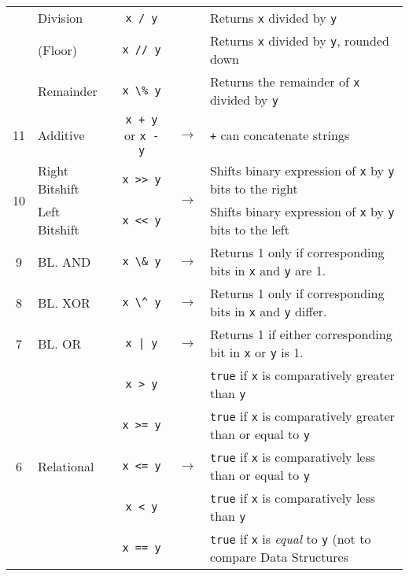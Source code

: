 \documentclass{article}
\begin{document}
\begin{center}
\begin{tabularx}{\textwidth}{clccX}
                      & Division & \lstinline|x / y| & & Returns \lstinline|x| divided by \lstinline|y|\\
                      & (Floor) & \lstinline|x // y| & & Returns \lstinline|x| divided by \lstinline|y|, rounded down\\
                      & Remainder & \lstinline|x \% y| & & Returns the remainder of \lstinline|x| divided by \lstinline|y|\\\midrule
                   11 & Additive & \lstinline|x + y| or \lstinline|x - y| & \(\to\) & \lstinline|+| can concatenate strings\\\midrule
  \multirow{2}{*}{10} & Right Bitshift & \lstinline|x >> y| & \multirow{2}{*}{\(\to\)} & Shifts binary expression of \lstinline|x| by \lstinline|y| bits to the right\\
                      & Left Bitshift & \lstinline|x << y| & & Shifts binary expression of \lstinline|x| by \lstinline|y| bits to the left\\\midrule
                  9   & BL. AND           & \lstinline|x \& y|    & \(\to\) & Returns 1 only if corresponding bits in \lstinline|x| and \lstinline|y| are 1. \\\midrule
                  8   & BL. XOR           & \lstinline|x \^ y|    & \(\to\) & Returns 1 only if corresponding bits in \lstinline|x| and \lstinline|y| differ.\\\midrule
                  7   & BL. OR            & \lstinline+x | y+     & \(\to\) & Returns 1 if either corresponding bit in \lstinline|x| or \lstinline|y| is 1.\\\midrule
  \multirow{10}{*}{6}  & \multirow{10}{*}{Relational}        & \lstinline|x > y| & \multirow{10}{*}{\(\to\)} & \lstinline|true| if \lstinline|x| is comparatively greater than \lstinline|y| \\
                      & & \lstinline|x >= y| & & \lstinline|true| if \lstinline|x| is comparatively greater than or equal to \lstinline|y| \\
                      & & \lstinline|x <= y| & & \lstinline|true| if \lstinline|x| is comparatively less than or equal to \lstinline|y| \\
                      & & \lstinline|x < y| & & \lstinline|true| if \lstinline|x| is comparatively less than \lstinline|y| \\
                      & & \lstinline|x == y| & & \lstinline|true| if \lstinline|x| is \textit{equal} to \lstinline|y| (not to compare Data Structures\\

\end{tabularx}
\end{center}
\end{document}
